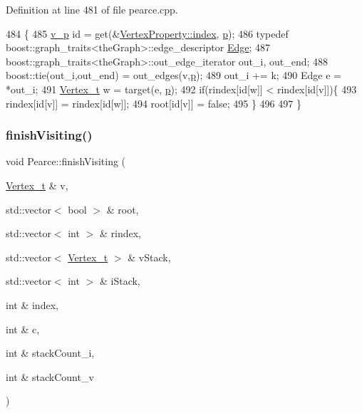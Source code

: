 Definition at line 481 of file pearce.\+cpp.


\begin{DoxyCode}
484                                                \{
485     \hyperlink{utilities_8h_a3f4959b3d837fa6351a9414c79280286}{v\_p} \textcolor{keywordtype}{id} = \textcolor{keyword}{get}(&\hyperlink{struct_utility_structs_1_1_vertex_property_a636cb729438e999aa3d9a17ac39d8641}{VertexProperty::index}, \hyperlink{class_pearce_a2320928312fd97f6bcb1f16684f79a03}{p});
486     \textcolor{keyword}{typedef} boost::graph\_traits<theGraph>::edge\_descriptor \hyperlink{class_graph_component_aa7517b2af08aa717324076a645c73fe6}{Edge};
487     boost::graph\_traits<theGraph>::out\_edge\_iterator out\_i, out\_end;
488     boost::tie(out\_i,out\_end) = out\_edges(v,\hyperlink{class_pearce_a2320928312fd97f6bcb1f16684f79a03}{p});
489     out\_i += k;
490     Edge e = *out\_i;
491     \hyperlink{utilities_8h_a344cd987714d06997f0becda3c96d6e2}{Vertex\_t} w = target(e, \hyperlink{class_pearce_a2320928312fd97f6bcb1f16684f79a03}{p});
492     \textcolor{keywordflow}{if}(rindex[\textcolor{keywordtype}{id}[w]] < rindex[\textcolor{keywordtype}{id}[v]])\{
493         rindex[\textcolor{keywordtype}{id}[v]] = rindex[\textcolor{keywordtype}{id}[w]];
494         root[\textcolor{keywordtype}{id}[v]] = \textcolor{keyword}{false};
495     \}
496 
497 \}
\end{DoxyCode}
\mbox{\label{class_pearce_a48afb6ccb75ba9df285c9701daf474b0}} 
\subsubsection{\texorpdfstring{finish\+Visiting()}{finishVisiting()}}
{\footnotesize\ttfamily void Pearce\+::finish\+Visiting (\begin{DoxyParamCaption}\item[{\hyperlink{class_graph_component_ae67114a6ce5a001dc35e1996e1b45aa0}{Vertex\+\_\+t} \&}]{v,  }\item[{std\+::vector$<$ bool $>$ \&}]{root,  }\item[{std\+::vector$<$ int $>$ \&}]{rindex,  }\item[{std\+::vector$<$ \hyperlink{class_graph_component_ae67114a6ce5a001dc35e1996e1b45aa0}{Vertex\+\_\+t} $>$ \&}]{v\+Stack,  }\item[{std\+::vector$<$ int $>$ \&}]{i\+Stack,  }\item[{int \&}]{index,  }\item[{int \&}]{c,  }\item[{int \&}]{stack\+Count\+\_\+i,  }\item[{int \&}]{stack\+Count\+\_\+v }\end{DoxyParamCaption})}



